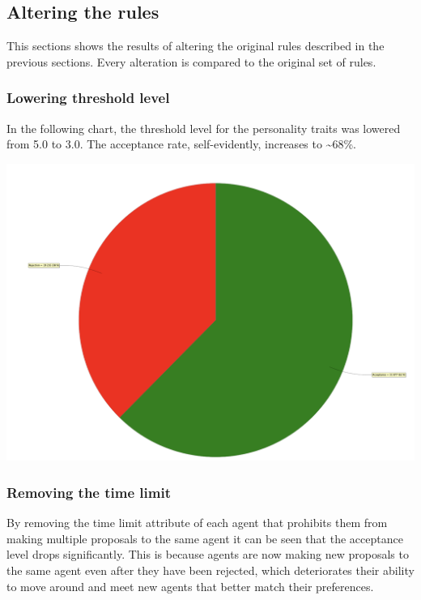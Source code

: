 \documentclass[a4paper,10pt]{article}
\begin{document}
\subsection{Altering the rules}
This sections shows the results of altering the original rules described in the previous sections. Every alteration is compared to the original set of rules.

\subsubsection{Lowering threshold level}
In the following chart, the threshold level for the personality traits was lowered from 5.0 to 3.0. The acceptance rate, self-evidently, increases to \textasciitilde 68\%.

\begin{center}{}
\centering\includegraphics[scale=0.05]{lowerthreshold.png}\par
\end{center}

\subsubsection{Removing the time limit}
By removing the time limit attribute of each agent that prohibits them from making multiple proposals to the same agent it can be seen that the acceptance level drops significantly. This is because agents are now making new proposals to the same agent even after they have been rejected, which deteriorates their ability to move around and meet new agents that better match their preferences.
\end{document}

